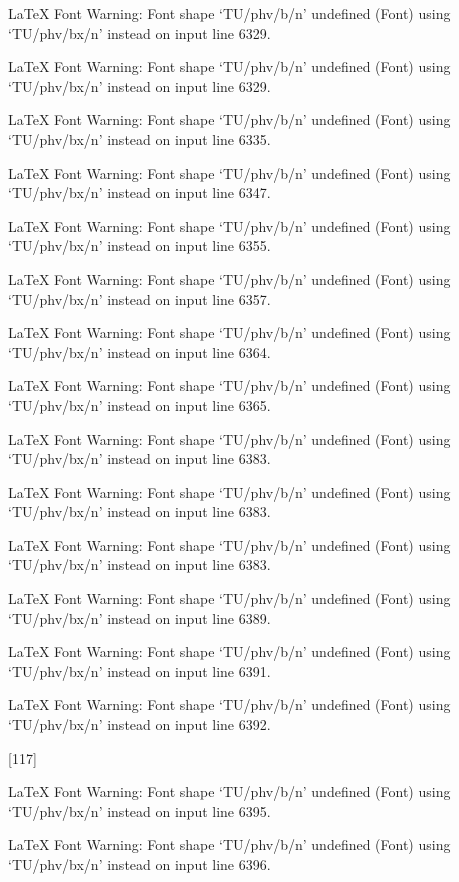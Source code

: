 LaTeX Font Warning: Font shape `TU/phv/b/n' undefined
(Font)              using `TU/phv/bx/n' instead on input line 6329.


LaTeX Font Warning: Font shape `TU/phv/b/n' undefined
(Font)              using `TU/phv/bx/n' instead on input line 6329.


LaTeX Font Warning: Font shape `TU/phv/b/n' undefined
(Font)              using `TU/phv/bx/n' instead on input line 6335.


LaTeX Font Warning: Font shape `TU/phv/b/n' undefined
(Font)              using `TU/phv/bx/n' instead on input line 6347.


LaTeX Font Warning: Font shape `TU/phv/b/n' undefined
(Font)              using `TU/phv/bx/n' instead on input line 6355.


LaTeX Font Warning: Font shape `TU/phv/b/n' undefined
(Font)              using `TU/phv/bx/n' instead on input line 6357.


LaTeX Font Warning: Font shape `TU/phv/b/n' undefined
(Font)              using `TU/phv/bx/n' instead on input line 6364.


LaTeX Font Warning: Font shape `TU/phv/b/n' undefined
(Font)              using `TU/phv/bx/n' instead on input line 6365.


LaTeX Font Warning: Font shape `TU/phv/b/n' undefined
(Font)              using `TU/phv/bx/n' instead on input line 6383.


LaTeX Font Warning: Font shape `TU/phv/b/n' undefined
(Font)              using `TU/phv/bx/n' instead on input line 6383.


LaTeX Font Warning: Font shape `TU/phv/b/n' undefined
(Font)              using `TU/phv/bx/n' instead on input line 6383.


LaTeX Font Warning: Font shape `TU/phv/b/n' undefined
(Font)              using `TU/phv/bx/n' instead on input line 6389.


LaTeX Font Warning: Font shape `TU/phv/b/n' undefined
(Font)              using `TU/phv/bx/n' instead on input line 6391.


LaTeX Font Warning: Font shape `TU/phv/b/n' undefined
(Font)              using `TU/phv/bx/n' instead on input line 6392.

[117]

LaTeX Font Warning: Font shape `TU/phv/b/n' undefined
(Font)              using `TU/phv/bx/n' instead on input line 6395.


LaTeX Font Warning: Font shape `TU/phv/b/n' undefined
(Font)              using `TU/phv/bx/n' instead on input line 6396.


